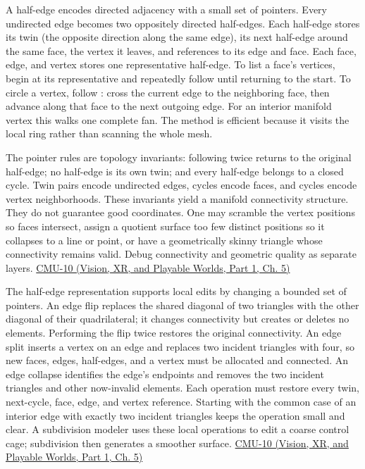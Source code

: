 A half-edge encodes directed adjacency with a small set of pointers. Every undirected edge becomes two oppositely directed half-edges. Each half-edge stores its twin (the opposite direction along the same edge), its next half-edge around the same face, the vertex it leaves, and references to its edge and face. Each face, edge, and vertex stores one representative half-edge. To list a face's vertices, begin at its representative and repeatedly follow  until returning to the start. To circle a vertex, follow : cross the current edge to the neighboring face, then advance along that face to the next outgoing edge. For an interior manifold vertex this walks one complete fan. The method is efficient because it visits the local ring rather than scanning the whole mesh.

The pointer rules are topology invariants: following  twice returns to the original half-edge; no half-edge is its own twin; and every half-edge belongs to a closed  cycle. Twin pairs encode undirected edges,  cycles encode faces, and  cycles encode vertex neighborhoods. These invariants yield a manifold connectivity structure. They do not guarantee good coordinates. One may scramble the vertex positions so faces intersect, assign a quotient surface too few distinct positions so it collapses to a line or point, or have a geometrically skinny triangle whose connectivity remains valid. Debug connectivity and geometric quality as separate layers. \href{../07-Vision-XR-and-Playable-Worlds-P01/main.pdf\#nameddest=04-visual-computing-ii-ch036-cmu-10---meshes-and-manifolds}{CMU-10 (Vision, XR, and Playable Worlds, Part 1, Ch. 5)}

The half-edge representation supports local edits by changing a bounded set of pointers. An edge flip replaces the shared diagonal of two triangles with the other diagonal of their quadrilateral; it changes connectivity but creates or deletes no elements. Performing the flip twice restores the original connectivity. An edge split inserts a vertex on an edge and replaces two incident triangles with four, so new faces, edges, half-edges, and a vertex must be allocated and connected. An edge collapse identifies the edge's endpoints and removes the two incident triangles and other now-invalid elements. Each operation must restore every twin, next-cycle, face, edge, and vertex reference. Starting with the common case of an interior edge with exactly two incident triangles keeps the operation small and clear. A subdivision modeler uses these local operations to edit a coarse control cage; subdivision then generates a smoother surface. \href{../07-Vision-XR-and-Playable-Worlds-P01/main.pdf\#nameddest=04-visual-computing-ii-ch036-cmu-10---meshes-and-manifolds}{CMU-10 (Vision, XR, and Playable Worlds, Part 1, Ch. 5)}

